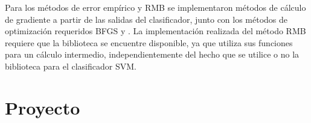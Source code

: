 Para los métodos de error empírico y RMB se implementaron métodos de
cálculo de gradiente a partir de las salidas del clasificador, junto
con los métodos de optimización requeridos BFGS \cite{nocedal} y
 \cite{linesearch}.
La implementación realizada del método RMB requiere que la biblioteca
 se encuentre disponible, ya que utiliza sus funciones para
un cálculo intermedio, independientemente del hecho que se utilice o no
la biblioteca para el clasificador SVM.

\chapter{Proyecto}